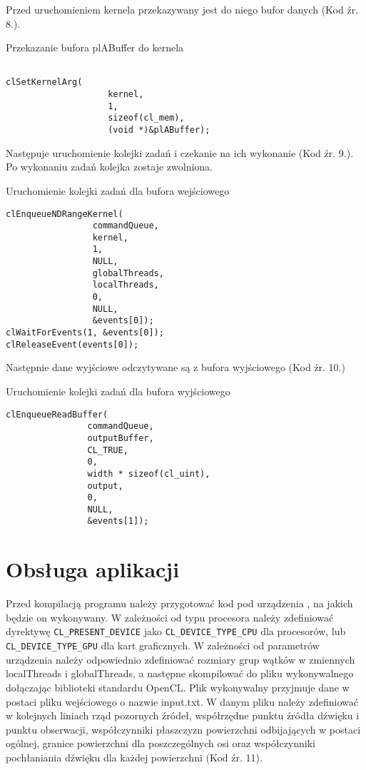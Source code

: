 Przed uruchomieniem kernela przekazywany jest do niego bufor danych (Kod źr. 8.).
\begin{program}
\caption{Przekazanie bufora plABuffer do kernela}
\begin{lstlisting}

clSetKernelArg(
                    kernel, 
                    1, 
                    sizeof(cl_mem), 
                    (void *)&plABuffer);
\end{lstlisting}
\end{program}
Następuje uruchomienie kolejki zadań i czekanie na ich wykonanie (Kod źr. 9.). Po wykonaniu zadań kolejka zostaje zwolniona.
\begin{program}
\caption{Uruchomienie kolejki zadań dla bufora wejściowego}
\begin{lstlisting}
clEnqueueNDRangeKernel(
                 commandQueue,
                 kernel,
                 1,
                 NULL,
                 globalThreads,
                 localThreads,
                 0,
                 NULL,
                 &events[0]);
clWaitForEvents(1, &events[0]);
clReleaseEvent(events[0]);
\end{lstlisting}
\end{program}
Następnie dane wyjściowe odczytywane są z bufora wyjściowego (Kod źr. 10.)
\begin{program}
\caption{Uruchomienie kolejki zadań dla bufora wyjściowego}
\begin{lstlisting}
clEnqueueReadBuffer(
                commandQueue,
                outputBuffer,
                CL_TRUE,
                0,
                width * sizeof(cl_uint),
                output,
                0,
                NULL,
                &events[1]);
\end{lstlisting}
\end{program}



\section{Obsługa aplikacji}\label{sec:oa}

Przed kompilacją programu należy przygotować kod pod urządzenia , na jakich  będzie on wykonywany. W zależności od typu procesora należy zdefiniować dyrektywę \verb|CL_PRESENT_DEVICE| jako \verb|CL_DEVICE_TYPE_CPU| dla procesorów, lub \verb|CL_DEVICE_TYPE_GPU| dla kart graficznych. W zależności od parametrów urządzenia należy odpowiednio zdefiniować rozmiary grup wątków w zmiennych localThreads i globalThreads, a następne skompilować do pliku wykonywalnego dołączając biblioteki standardu OpenCL. Plik wykonywalny przyjmuje dane w postaci pliku wejściowego o nazwie input.txt. W danym pliku należy zdefiniować w kolejnych liniach  rząd pozornych źródeł, współrzędne punktu źródła dźwięku i punktu obserwacji, współczynniki płaszczyzn powierzchni odbijających w postaci ogólnej, granice powierzchni dla poszczególnych osi oraz współczynniki pochłaniania dźwięku dla każdej powierzchni (Kod źr. 11).


